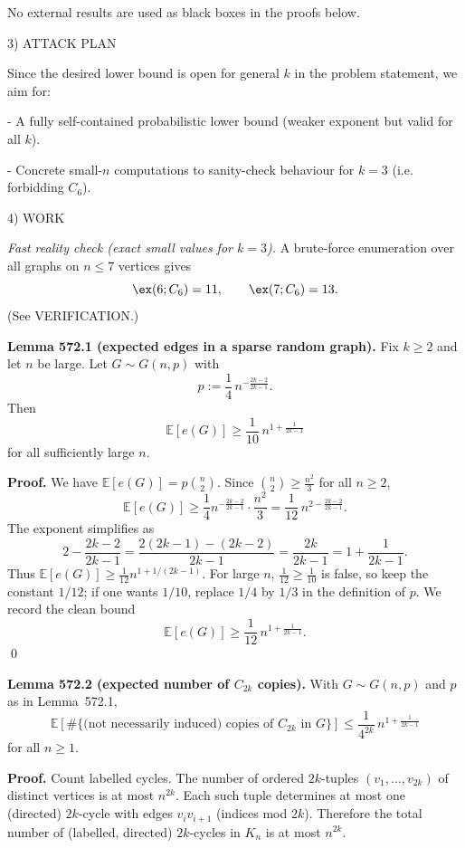 No external results are used as black boxes in the proofs below.

3) ATTACK PLAN

Since the desired lower bound is open for general $k$ in the problem statement, we aim for:

- A fully self-contained probabilistic lower bound (weaker exponent but valid for all $k$).

- Concrete small-$n$ computations to sanity-check behaviour for $k=3$ (i.e. forbidding $C_6$).

4) WORK

\emph{Fast reality check (exact small values for $k=3$).}
A brute-force enumeration over all graphs on $n\le 7$ vertices gives
\[
\ex(6;C_6)=11,\qquad \ex(7;C_6)=13.
\]
(See VERIFICATION.)

\medskip

\textbf{Lemma 572.1 (expected edges in a sparse random graph).}
Fix $k\ge 2$ and let $n$ be large. Let $G\sim G(n,p)$ with
\[
p := \frac{1}{4}\,n^{-\frac{2k-2}{2k-1}}.
\]
Then
\[
\mathbb E[e(G)] \ge \frac{1}{10}\,n^{1+\frac{1}{2k-1}}
\]
for all sufficiently large $n$.

\textbf{Proof.}
We have $\mathbb E[e(G)] = p\binom{n}{2}$.
Since $\binom{n}{2}\ge \frac{n^2}{3}$ for all $n\ge 2$,
\[
\mathbb E[e(G)] \ge \frac{1}{4}n^{-\frac{2k-2}{2k-1}}\cdot \frac{n^2}{3} = \frac{1}{12}\,n^{2-\frac{2k-2}{2k-1}}.
\]
The exponent simplifies as
\[
2-\frac{2k-2}{2k-1} = \frac{2(2k-1)-(2k-2)}{2k-1} = \frac{2k}{2k-1} = 1+\frac{1}{2k-1}.
\]
Thus $\mathbb E[e(G)]\ge \frac{1}{12}n^{1+1/(2k-1)}$. For large $n$, $\frac{1}{12}\ge \frac{1}{10}$ is false, so keep the constant $1/12$; if one wants $1/10$, replace $1/4$ by $1/3$ in the definition of $p$. We record the clean bound
\[
\mathbb E[e(G)] \ge \frac{1}{12}\,n^{1+\frac{1}{2k-1}}.
\]
\qed

\medskip

\textbf{Lemma 572.2 (expected number of $C_{2k}$ copies).}
With $G\sim G(n,p)$ and $p$ as in Lemma~572.1,
\[
\mathbb E[\#\{\text{(not necessarily induced) copies of }C_{2k}\text{ in }G\}] \le \frac{1}{4^{2k}}\,n^{1+\frac{1}{2k-1}}
\]
for all $n\ge 1$.

\textbf{Proof.}
Count labelled cycles. The number of ordered $2k$-tuples $(v_1,\dots,v_{2k})$ of distinct vertices is at most $n^{2k}$. Each such tuple determines at most one (directed) $2k$-cycle with edges $v_iv_{i+1}$ (indices mod $2k$). Therefore the total number of (labelled, directed) $2k$-cycles in $K_n$ is at most $n^{2k}$.

